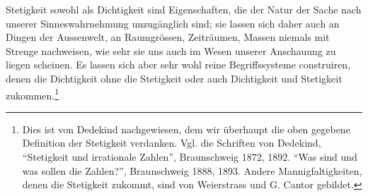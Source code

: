 \documentclass[11pt]{article}
\begin{document}
Stetigkeit sowohl als Dichtigkeit sind Eigenschaften, die der Natur der Sache nach unserer Sinneswahrnehmung unzugänglich sind; sie lassen sich daher auch an Dingen der Aussenwelt, an Raumgrössen, Zeiträumen, Massen niemals mit Strenge nachweisen, wie sehr sie uns auch im Wesen unserer Anschauung zu liegen scheinen. Es lassen sich aber sehr wohl reine Begriffssysteme construiren, denen die Dichtigkeit ohne die Stetigkeit oder auch Dichtigkeit und Stetigkeit zukommen.\footnote{Dies ist von Dedekind nachgewiesen, dem wir überhaupt die oben gegebene Definition der Stetigkeit verdanken. Vgl. die Schriften von Dedekind, ``Stetigkeit und irrationale Zahlen'', Braunschweig 1872, 1892. ``Was sind und was sollen die Zahlen?'', Braunschweig 1888, 1893. Andere Mannigfaltigkeiten, denen die Stetigkeit zukommt, sind von Weierstrass und G. Cantor gebildet.}
\end{document}
